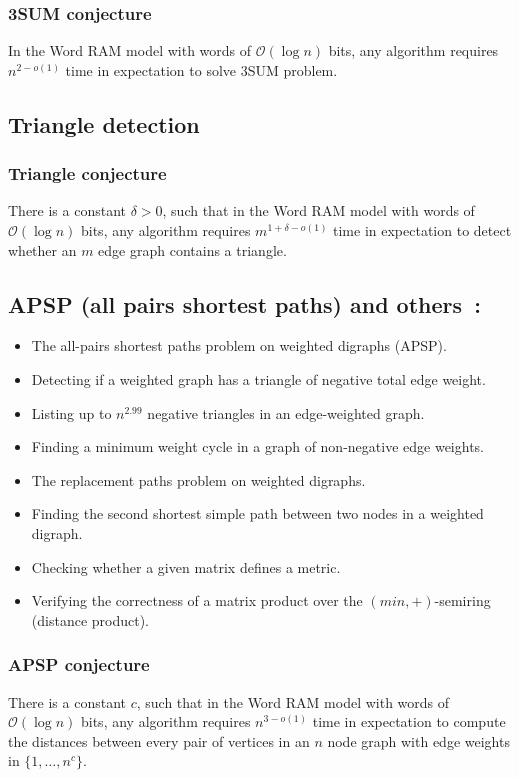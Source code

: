 \documentclass{amsart}
\begin{document}
	\subsubsection{3SUM conjecture}
	In the Word RAM model with words of $\mathcal{O}(\log n)$ bits, any algorithm requires $n^{2 - o(1)}$ time in expectation to solve 3SUM problem.
	
	\subsection{Triangle detection}
	
	\subsubsection{Triangle conjecture}
	There is a constant $\delta > 0$, such that in the Word RAM model with words of $\mathcal{O}(\log n)$ bits, any algorithm requires $m^{1 + \delta - o(1)}$ time in expectation to detect whether an $m$ edge graph contains a triangle.
	
	\subsection{APSP (all pairs shortest paths) and others~\cite{10.1145/3186893}:}
	\label{apsp_equiv}
	
	\begin{itemize}
		\item The all-pairs shortest paths problem on weighted digraphs (APSP).
		\item Detecting if a weighted graph has a triangle of negative total edge weight.
		\item Listing up to $n^{2.99}$ negative triangles in an edge-weighted graph.
		\item Finding a minimum weight cycle in a graph of non-negative edge weights.
		\item The replacement paths problem on weighted digraphs.
		\item Finding the second shortest simple path between two nodes in a weighted digraph.
		\item Checking whether a given matrix defines a metric.
		\item Verifying the correctness of a matrix product over the $(min, +)$-semiring (distance product).
	\end{itemize}
	
	\subsubsection{APSP conjecture}
	There is a constant $c$, such that in the Word RAM model with words of $\mathcal{O}(\log n)$ bits, any algorithm requires $n^{3 - o(1)}$ time in expectation to compute the distances between every pair of vertices in an $n$ node graph with edge weights in $\{1, \ldots, n^c\}$.
	
\end{document}
